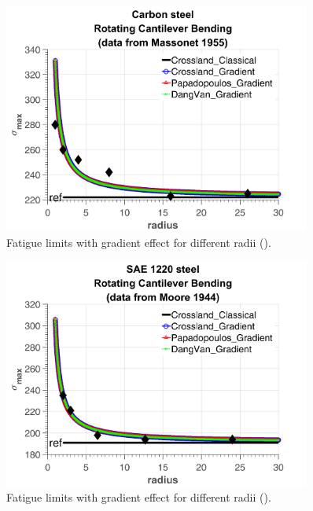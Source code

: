 \newpage
\begin{figure}[!h]
	\begin{center}
		\includegraphics[width=0.9\textwidth]{figures//carbonsteel.png} 
		\caption{Fatigue limits with gradient effect for different radii (\cite{Massonnet1955}).}
		\label{fig.gradientcalibration1}
	\end{center}
\end{figure}

\begin{figure}[!h]
	\begin{center}
		\includegraphics[width=0.9\textwidth]{figures//1220steel.png} 
		\caption{Fatigue limits with gradient effect for different radii (\cite{Moore1944}).}
		\label{fig.gradientcalibration2}
	\end{center}
\end{figure}

